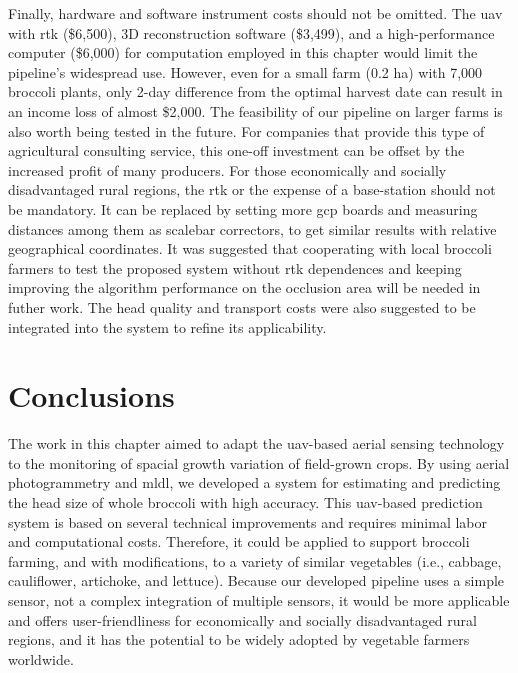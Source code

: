 Finally, hardware and software instrument costs should not be omitted. The \gls{uav} with \gls{rtk} (\$6,500), 3D reconstruction software (\$3,499), and a high-performance computer (\$6,000) for computation employed in this chapter would limit the pipeline's widespread use. However, even for a small farm (0.2 ha) with 7,000 broccoli plants, only 2-day difference from the optimal harvest date can result in an income loss of almost \$2,000. The feasibility of our pipeline on larger farms is also worth being tested in the future. For companies that provide this type of agricultural consulting service, this one-off investment can be offset by the increased profit of many producers. For those economically and socially disadvantaged rural regions, the \gls{rtk} or the expense of a base-station should not be mandatory. It can be replaced by setting more \gls{gcp} boards and measuring distances among them as scalebar correctors, to get similar results with relative geographical coordinates. It was suggested that cooperating with local broccoli farmers to test the proposed system without \gls{rtk} dependences and keeping improving the algorithm performance on the occlusion area will be needed in futher work. The head quality and transport costs were also suggested to be integrated into the system to refine its applicability.

\section{Conclusions}

The work in this chapter aimed to adapt the \gls{uav}-based aerial sensing technology to the monitoring of spacial growth variation of field-grown crops. By using aerial photogrammetry and \gls{mldl}, we developed a system for estimating and predicting the head size of whole broccoli with high accuracy. This \gls{uav}-based prediction system is based on several technical improvements and requires minimal labor and computational costs. Therefore, it could be applied to support broccoli farming, and with modifications, to a variety of similar vegetables (i.e., cabbage, cauliflower, artichoke, and lettuce). Because our developed pipeline uses a simple sensor, not a complex integration of multiple sensors, it would be more applicable and offers user-friendliness for economically and socially disadvantaged rural regions, and it has the potential to be widely adopted by vegetable farmers worldwide.


